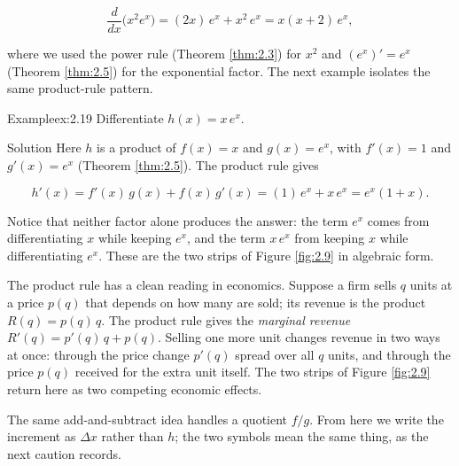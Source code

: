 \documentclass[a4paper,12pt,oneside]{memoir}
\begin{document}
\[ \frac{d}{dx}\bigl(x^{2} e^{x}\bigr) = (2x)\,e^{x} + x^{2}\,e^{x} = x(x + 2)\,e^{x}, \]

where we used the power rule (Theorem \ref{thm:2.3}) for \(x^{2}\) and \((e^{x})' = e^{x}\) (Theorem \ref{thm:2.5}) for the exponential factor. The next example isolates the same product-rule pattern.

\begin{workedexample}
\begin{envexample}{Example}{ex:2.19}{}
Differentiate \(h(x) = x\,e^{x}\).
\end{envexample}
\begin{envsolution}{Solution}{}{}
Here \(h\) is a product of \(f(x) = x\) and \(g(x) = e^{x}\), with \(f'(x) = 1\) and \(g'(x) = e^{x}\) (Theorem \ref{thm:2.5}). The product rule gives

\[ h'(x) = f'(x)\,g(x) + f(x)\,g'(x) = (1)\,e^{x} + x\,e^{x} = e^{x}(1 + x). \]

Notice that neither factor alone produces the answer: the term \(e^{x}\) comes from differentiating \(x\) while keeping \(e^{x}\), and the term \(x\,e^{x}\) from keeping \(x\) while differentiating \(e^{x}\). These are the two strips of Figure \ref{fig:2.9} in algebraic form.
\end{envsolution}
\end{workedexample}
The product rule has a clean reading in economics. Suppose a firm sells \(q\) units at a price \(p(q)\) that depends on how many are sold; its revenue is the product \(R(q) = p(q)\,q\). The product rule gives the \emph{marginal revenue} \(R'(q) = p'(q)\,q + p(q)\). Selling one more unit changes revenue in two ways at once: through the price change \(p'(q)\) spread over all \(q\) units, and through the price \(p(q)\) received for the extra unit itself. The two strips of Figure \ref{fig:2.9} return here as two competing economic effects.

The same add-and-subtract idea handles a quotient \(f/g\). From here we write the increment as \(\Delta x\) rather than \(h\); the two symbols mean the same thing, as the next caution records.
\end{document}
